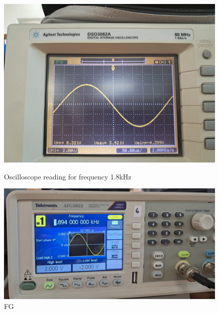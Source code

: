 \documentclass[a4paper,12pt]{article}
\begin{document}
\begin{figure}[H]
    \centering
    \begin{minipage}[b]{0.45\textwidth}
        \centering
        \includegraphics[width=\textwidth]{fig/lp/1.8ko.jpeg}
        \caption{Oscilloscope reading for frequency 1.8kHz}
    \end{minipage}
    \hfill
    \begin{minipage}[b]{0.45\textwidth}
        \centering
        \includegraphics[width=\textwidth]{fig/lp/1.8k.jpeg}
        \caption{FG}
    \end{minipage}
\end{figure}
\end{document}
